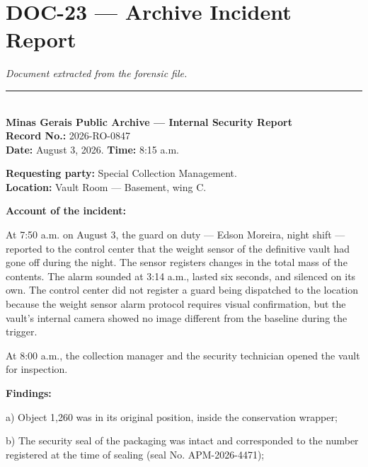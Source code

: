 \section*{\textbf{DOC-23} --- Archive Incident Report}

\noindent \textit{Document extracted from the forensic file.}

\vspace{0.5em}\noindent\rule{\textwidth}{0.5pt}\vspace{0.5em}

\\[-0.2em]

\noindent \textbf{Minas Gerais Public Archive --- Internal Security Report}\\
\noindent \textbf{Record No.:} 2026-RO-0847\\
\noindent\textbf{Date:} August 3, 2026. \textbf{Time:} 8:15 a.m.

\noindent \textbf{Requesting party:} Special Collection Management.\\
\noindent \textbf{Location:} Vault Room --- Basement, wing C.

\noindent \textbf{Account of the incident:}

\noindent At 7:50 a.m. on August 3, the guard on duty --- Edson Moreira, night shift --- reported to the control center that the weight sensor of the definitive vault had gone off during the night. The sensor registers changes in the total mass of the contents. The alarm sounded at 3:14 a.m., lasted six seconds, and silenced on its own. The control center did not register a guard being dispatched to the location because the weight sensor alarm protocol requires visual confirmation, but the vault's internal camera showed no image different from the baseline during the trigger.

\noindent At 8:00 a.m., the collection manager and the security technician opened the vault for inspection.

\noindent \textbf{Findings:}

\noindent a) Object 1,260 was in its original position, inside the conservation wrapper;

\noindent b) The security seal of the packaging was intact and corresponded to the number registered at the time of sealing (seal No. APM-2026-4471);

